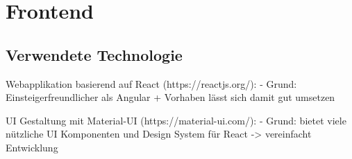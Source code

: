 \section{Frontend}

\subsection{Verwendete Technologie}

Webapplikation basierend auf React (https://reactjs.org/):
- Grund: Einsteigerfreundlicher als Angular + Vorhaben lässt sich damit gut umsetzen 

UI Gestaltung mit Material-UI (https://material-ui.com/):
- Grund: bietet viele nützliche UI Komponenten und Design System für React -> vereinfacht Entwicklung
